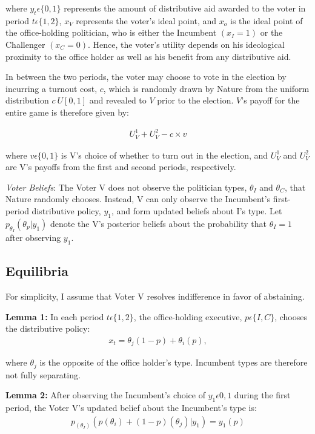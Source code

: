 \documentclass[12pt]{paper}
\begin{document}
where $y_t \epsilon \{0,1\}$ represents the amount of distributive aid awarded to the voter in period $t \epsilon \{1,2\}$, $x_V$ represents the voter’s ideal point, and $x_o$ is the ideal point of the office-holding politician, who is either the Incumbent $(x_I = 1)$ or the Challenger $(x_C = 0).$ Hence, the voter’s utility depends on his ideological proximity to the office holder as well as his benefit from any distributive aid.

In between the two periods, the voter may choose to vote in the election by incurring a turnout cost, $c$, which is randomly drawn by Nature from the uniform distribution $c~U[0,1]$ and revealed to $V$ prior to the election. $V$’s payoff for the entire game is therefore given by:

\begin{gather}
U_{V}^1 + U_{V}^2 - c \times v
\end{gather}

where $v \epsilon \{0,1\}$ is V’s choice of whether to turn out in the election, and $U_{V}^1$ and $U_{V}^2$ are V’s payoffs from the first and second periods, respectively.

\emph{Voter Beliefs}: The Voter V does not observe the politician types, $\theta_I$ and $\theta_C$, that Nature randomly chooses. Instead, V can only observe the Incumbent's first-period distributive policy,  $y_1$, and form updated beliefs about I’s type. Let $p_{\theta_I} (\theta_p | y_1 )$ denote the V’s posterior beliefs about the probability that $\theta_I = 1$ after observing $y_1$.

\subsection{Equilibria}
For simplicity, I assume that Voter V resolves indifference in favor of abstaining.
	
\textbf{Lemma 1:} In each period $t \epsilon \{1,2\}$, the office-holding executive, $p \epsilon \{I,C\}$, chooses the distributive policy: 
\begin{gather}
x_t=\theta_j (1-p)+ \theta_i (p), 
\end{gather}

where $\theta_j$ is the opposite of the office holder’s type. Incumbent types are therefore not fully separating.

\textbf{Lemma 2:}  After observing the Incumbent’s choice of $y_1 \epsilon {0,1}$ during the first period, the Voter V’s updated belief about the Incumbent’s type is: 
\begin{gather}
p_{(\theta_I)}(p(\theta_i ) + (1 - p)(\theta_j ) | y_1 )=y_1(p)
\end{gather}
\end{document}
